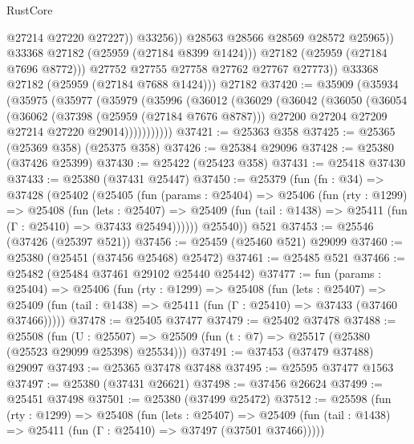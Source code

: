 \begin{lexlean}{RustCore}
\begin{coremodule}
                          @27214
                          @27220
                          @27227))
                      @33256))
                  @28563
                  @28566
                  @28569
                  @28572
                  @25965))
              @33368
              @27182
              (@25959 (@27184 @8399 @1424)))
            @27182
            (@25959 (@27184 @7696 @8772)))
          @27752
          @27755
          @27758
          @27762
          @27767
          @27773))
      @33368
      @27182
      (@25959 (@27184 @7688 @1424)))
    @27182
@37420 := @35909
    (@35934
      (@35975
        (@35977
          (@35979
            (@35996
              (@36012
                (@36029
                  (@36042
                    (@36050
                      (@36054
                        (@36062
                          (@37398 (@25959 (@27184 @7676 @8787)))
                          @27200
                          @27204
                          @27209
                          @27214
                          @27220
                          @29014)))))))))))
@37421 := @25363 @358
@37425 := @25365 (@25369 @358) (@25375 @358)
@37426 := @25384 @29096
@37428 := @25380 (@37426 @25399)
@37430 := @25422 (@25423 @358)
@37431 := @25418 @37430
@37433 := @25380 (@37431 @25447)
@37450 := @25379
    (fun (fn : @34) =>
    @37428
      (@25402
        (@25405
          (fun (params : @25404) =>
          @25406
            (fun (rty : @1299) =>
            @25408
              (fun (lets : @25407) =>
              @25409 (fun (tail : @1438) => @25411 (fun (Γ : @25410) => @37433 @25494))))))
        @25540))
    @521
@37453 := @25546 (@37426 (@25397 @521))
@37456 := @25459 (@25460 @521) @29099
@37460 := @25380 (@25451 (@37456 @25468) @25472)
@37461 := @25485 @521
@37466 := @25482 (@25484 @37461 @29102 @25440 @25442)
@37477 := fun (params : @25404) =>
  @25406
    (fun (rty : @1299) =>
    @25408
      (fun (lets : @25407) =>
      @25409 (fun (tail : @1438) => @25411 (fun (Γ : @25410) => @37433 (@37460 @37466)))))
@37478 := @25405 @37477
@37479 := @25402 @37478
@37488 := @25508
    (fun (U : @25507) => @25509 (fun (t : @7) => @25517 (@25380 (@25523 @29099 @25398) @25534)))
@37491 := @37453 (@37479 @37488) @29097
@37493 := @25365 @37478 @37488
@37495 := @25595 @37477 @1563
@37497 := @25380 (@37431 @26621)
@37498 := @37456 @26624
@37499 := @25451 @37498
@37501 := @25380 (@37499 @25472)
@37512 := @25598
    (fun (rty : @1299) =>
    @25408
      (fun (lets : @25407) =>
      @25409 (fun (tail : @1438) => @25411 (fun (Γ : @25410) => @37497 (@37501 @37466)))))

\end{coremodule}
\end{lexlean}
